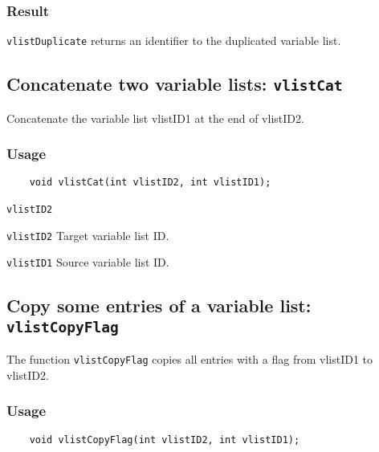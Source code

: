 \subsubsection*{Result}

{\texttt{vlistDuplicate}} returns an identifier to the duplicated variable list.



\subsection{Concatenate two variable lists: \texttt{vlistCat}}
\label{vlistCat}

Concatenate the variable list vlistID1 at the end of vlistID2.

\subsubsection*{Usage}

\begin{verbatim}
    void vlistCat(int vlistID2, int vlistID1);
\end{verbatim}

\hspace*{4mm}\begin{minipage}[]{15cm}
\begin{deflist}{\texttt{vlistID2}\ }
\item[\texttt{vlistID2}]
Target variable list ID.
\item[\texttt{vlistID1}]
Source variable list ID.

\end{deflist}
\end{minipage}


\subsection{Copy some entries of a variable list: \texttt{vlistCopyFlag}}
\label{vlistCopyFlag}

The function {\texttt{vlistCopyFlag}} copies all entries with a flag from vlistID1 to vlistID2.

\subsubsection*{Usage}

\begin{verbatim}
    void vlistCopyFlag(int vlistID2, int vlistID1);
\end{verbatim}

